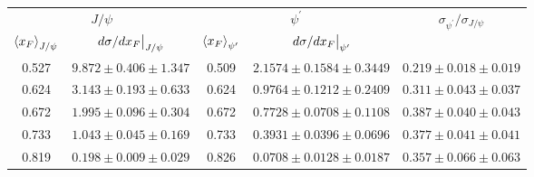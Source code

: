 \begin{tabular}{cc|cc|c}
\hline
\multicolumn{2}{c|}{$J/\psi$} &
  \multicolumn{2}{c|}{$\psi^{\prime}$} &
  \multirow{2}{*}{$\sigma_{\psi^\prime}/\sigma_{J/\psi}$} \\ \cline{1-4}
$\expval{x_F}_{J/\psi}$ &
  $\eval{d\sigma/dx_F}_{J/\psi}$ &
  $\expval{x_F}_{\psi^\prime}$ &
  $\eval{d\sigma/dx_F}_{\psi^\prime}$ &
   \\ \hline
\multicolumn{1}{c|}{0.527} &
  $9.872\pm0.406\pm1.347$ &
  \multicolumn{1}{c|}{0.509} &
  $2.1574\pm0.1584\pm0.3449$ &
  $0.219\pm0.018\pm0.019$ \\
\multicolumn{1}{c|}{0.624} &
  $3.143\pm0.193\pm0.633$ &
  \multicolumn{1}{c|}{0.624} &
  $0.9764\pm0.1212\pm0.2409$ &
  $0.311\pm0.043\pm0.037$ \\
\multicolumn{1}{c|}{0.672} &
  $1.995\pm0.096\pm0.304$ &
  \multicolumn{1}{c|}{0.672} &
  $0.7728\pm0.0708\pm0.1108$ &
  $0.387\pm0.040\pm0.043$ \\
\multicolumn{1}{c|}{0.733} &
  $1.043\pm0.045\pm0.169$ &
  \multicolumn{1}{c|}{0.733} &
  $0.3931\pm0.0396\pm0.0696$ &
  $0.377\pm0.041\pm0.041$ \\
\multicolumn{1}{c|}{0.819} &
  $0.198\pm0.009\pm0.029$ &
  \multicolumn{1}{c|}{0.826} &
  $0.0708\pm0.0128\pm0.0187$ &
  $0.357\pm0.066\pm0.063$ \\ \hline
\end{tabular}
